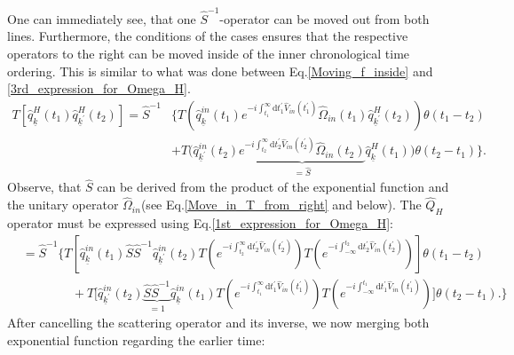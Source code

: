 \documentclass[
11pt, %
english, %
singlespacing, %
headsepline, %
]{MastersDoctoralThesis} %
\begin{document}
One can immediately see, that one $ \hat{S}^{-1} $-operator can be moved out from both lines. Furthermore, the conditions of the cases ensures that the respective operators to the right can be moved inside of the inner chronological time ordering. This is similar to what was done between Eq.\enskip\eqref{Moving_f_inside} and \eqref{3rd_expression_for_Omega_H}. 
\begin{equation}
\begin{split}
T\left[
\hat{q}^{H}_{\underline{k}}(t_1)
\hat{q}^{H}_{\underline{k}^{\prime}}(t_2)
\right]
=
\hat{S}^{-1}
&\Big\{
T\left(\hat{q}^{in}_{\underline{k}}(t_1)  e^{-i\int_{t_{1}}^{\infty}\mathrm{d}t^{\prime}_{1} \hat{V}_{in}(t_{1}^{\prime})}\hat{\Omega}_{in}(t_1) \hat{q}^{H}_{\underline{k}^{\prime}}(t_2)\right)   \theta(t_1 - t_2)
		\\
    &+T\Big( \hat{q}^{in}_{\underline{k}^{\prime}}(t_2)  
    \underbrace{
    e^{-i\int_{t_{2}}^{\infty}\mathrm{d}t^{\prime}_{2} \hat{V}_{in}(t_{2}^{\prime})}\hat{\Omega}_{in}(t_2)  }_{=\hat{S}}
    \hat{q}^{H}_{\underline{k}}(t_1)
    \Big)
        \theta(t_2 - t_1)
    \Big\}.  
    \end{split}
\end{equation}
Observe, that $ \hat{S} $ can be derived from the product of the exponential function and the unitary operator $ \hat{\Omega}_{in} $(see Eq.\enskip\eqref{Move_in_T_from_right} and below). The $ \hat{Q}_{H}$ operator must be expressed using Eq.\enskip\eqref{1st_expression_for_Omega_H}:
\begin{equation}
\begin{split}
&=\hat{S}^{-1}
\Big\{
T\left[
	\hat{q}^{in}_{\underline{k}}(t_1)\hat{S} \hat{S}^{-1}
	\hat{q}^{in}_{\underline{k}^{\prime}}(t_2)
 	T\left( 
 		e^{-i\int_{t_{2}}^{\infty}\mathrm{d}t_{2}^{\prime} \hat{V}_{in}(t_{2}^{\prime})}
	\right)
 	T\left( 
 		e^{-i\int_{-\infty}^{t_{2}}\mathrm{d}t_{2}^{\prime} \hat{V}_{in}(t_{2}^{\prime})}
 	\right)
\right]
				  \theta(t_1 - t_2)
		\\
&\qquad\qquad +T\Big[
	\hat{q}^{in}_{\underline{k}^{\prime}}(t_2)\underbrace{\hat{S} \hat{S}^{-1}}_{=1}
	\hat{q}^{in}_{\underline{k}}(t_1)
 	T\left( 
 		e^{-i\int_{t_{1}}^{\infty}\mathrm{d}t_{1}^{\prime} \hat{V}_{in}(t_{1}^{\prime})}
	\right)
 	T\left( 
 		e^{-i\int_{-\infty}^{t_{1}}\mathrm{d}t_{1}^{\prime} \hat{V}_{in}(t_{1}^{\prime})}
 	\right)
\Big]
        \theta(t_2 - t_1).
    \Big\}  
    \end{split}
\end{equation}
After cancelling the scattering operator and its inverse, we now merging both exponential function regarding the earlier time:
\end{document}
